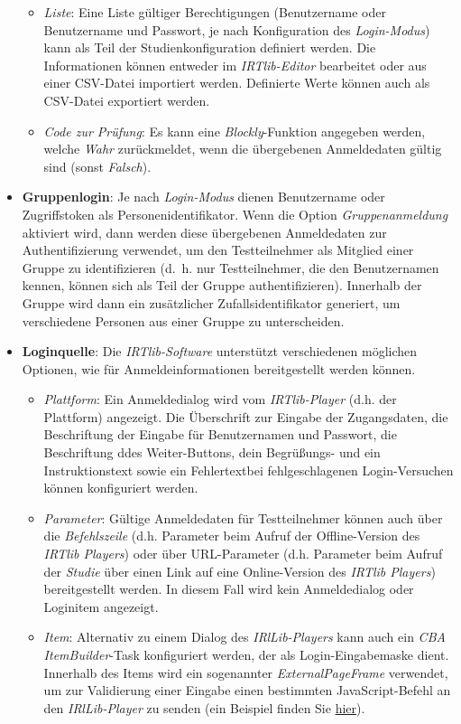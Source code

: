 \documentclass[
  letterpaper,
  DIV=11]{scrreprt}
\begin{document}
\begin{tcolorbox}
\begin{itemize}
  \begin{itemize}
  \item
    \emph{Liste}: Eine Liste gültiger Berechtigungen (Benutzername oder
    Benutzername und Passwort, je nach Konfiguration des
    \emph{Login-Modus}) kann als Teil der Studienkonfiguration definiert
    werden. Die Informationen können entweder im \emph{IRTlib-Editor}
    bearbeitet oder aus einer CSV-Datei importiert werden. Definierte
    Werte können auch als CSV-Datei exportiert werden.
  \item
    \emph{Code zur Prüfung}: Es kann eine \emph{Blockly}-Funktion
    angegeben werden, welche \emph{Wahr} zurückmeldet, wenn die
    übergebenen Anmeldedaten gültig sind (sonst \emph{Falsch}).
  \end{itemize}
\item
  \textbf{Gruppenlogin}: Je nach \emph{Login-Modus} dienen Benutzername
  oder Zugriffstoken als Personenidentifikator. Wenn die Option
  \emph{Gruppenanmeldung} aktiviert wird, dann werden diese übergebenen
  Anmeldedaten zur Authentifizierung verwendet, um den Testteilnehmer
  als Mitglied einer Gruppe zu identifizieren (d.~h. nur Testteilnehmer,
  die den Benutzernamen kennen, können sich als Teil der Gruppe
  authentifizieren). Innerhalb der Gruppe wird dann ein zusätzlicher
  Zufallsidentifikator generiert, um verschiedene Personen aus einer
  Gruppe zu unterscheiden.
\item
  \textbf{Loginquelle}: Die \emph{IRTlib-Software} unterstützt
  verschiedenen möglichen Optionen, wie für Anmeldeinformationen
  bereitgestellt werden können.

  \begin{itemize}
  \item
    \emph{Plattform}: Ein Anmeldedialog wird vom \emph{IRTlib-Player}
    (d.h. der Plattform) angezeigt. Die Überschrift zur Eingabe der
    Zugangsdaten, die Beschriftung der Eingabe für Benutzernamen und
    Passwort, die Beschriftung ddes Weiter-Buttons, dein Begrüßungs- und
    ein Instruktionstext sowie ein Fehlertextbei fehlgeschlagenen
    Login-Versuchen können konfiguriert werden.
  \item
    \emph{Parameter}: Gültige Anmeldedaten für Testteilnehmer können
    auch über die \emph{Befehlszeile} (d.h. Parameter beim Aufruf der
    Offline-Version des \emph{IRTlib Players}) oder über URL-Parameter
    (d.h. Parameter beim Aufruf der \emph{Studie} über einen Link auf
    eine Online-Version des \emph{IRTlib Players}) bereitgestellt
    werden. In diesem Fall wird kein Anmeldedialog oder Loginitem
    angezeigt.
  \item
    \emph{Item}: Alternativ zu einem Dialog des \emph{IRlLib-Players}
    kann auch ein \emph{CBA ItemBuilder}-Task konfiguriert werden, der
    als Login-Eingabemaske dient. Innerhalb des Items wird ein
    sogenannter \emph{ExternalPageFrame} verwendet, um zur Validierung
    einer Eingabe einen bestimmten JavaScript-Befehl an den
    \emph{IRlLib-Player} zu senden (ein Beispiel finden Sie
    \href{https://kroehne.github.io/CBAItemBuilderBook/items/10_00/IRTLibLoginExample.zip}{hier}).
  \end{itemize}
\end{itemize}


\end{tcolorbox}
\end{document}
